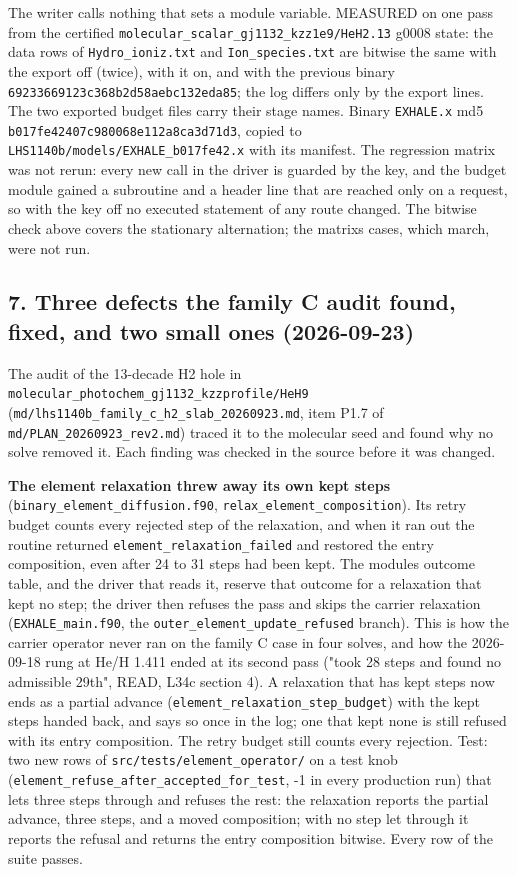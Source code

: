 \documentclass[english,a4paper]{my_memo}
\begin{document}
The writer calls nothing that sets a module variable. MEASURED on one pass
from the certified \texttt{molecular\_scalar\_gj1132\_kzz1e9/HeH2.13} g0008 state: the
data rows of \texttt{Hydro\_ioniz.txt} and \texttt{Ion\_species.txt} are bitwise the same with
the export off (twice), with it on, and with the previous binary
\texttt{69233669123c368b2d58aebc132eda85}; the log differs only by the export
lines. The two exported budget files carry their stage names. Binary
\texttt{EXHALE.x} md5 \texttt{b017fe42407c980068e112a8ca3d71d3}, copied to
\texttt{LHS1140b/models/EXHALE\_b017fe42.x} with its manifest. The regression matrix
was not rerun: every new call in the driver is guarded by the key, and the
budget module gained a subroutine and a header line that are reached only on
a request, so with the key off no executed statement of any route changed.
The bitwise check above covers the stationary alternation; the matrix\textquotesingle s
cases, which march, were not run.

\subsection{7. Three defects the family C audit found, fixed, and two small ones (2026-09-23)}\label{7-three-defects-the-family-c-audit-found-fixed-and-two-small-ones-2026-09-23}

The audit of the 13-decade H2 hole in
\texttt{molecular\_photochem\_gj1132\_kzzprofile/HeH9}
(\texttt{md/lhs1140b\_family\_c\_h2\_slab\_20260923.md}, item P1.7 of
\texttt{md/PLAN\_20260923\_rev2.md}) traced it to the molecular seed and found why no
solve removed it. Each finding was checked in the source before it was
changed.

\textbf{The element relaxation threw away its own kept steps}
(\texttt{binary\_element\_diffusion.f90}, \texttt{relax\_element\_composition}). Its retry
budget counts every rejected step of the relaxation, and when it ran out the
routine returned \texttt{element\_relaxation\_failed} and restored the entry
composition, even after 24 to 31 steps had been kept. The module\textquotesingle s outcome
table, and the driver that reads it, reserve that outcome for a relaxation
that kept no step; the driver then refuses the pass and skips the carrier
relaxation (\texttt{EXHALE\_main.f90}, the \texttt{outer\_element\_update\_refused} branch).
This is how the carrier operator never ran on the family C case in four
solves, and how the 2026-09-18 rung at He/H 1.411 ended at its second pass
("took 28 steps and found no admissible 29th", READ, L34c section 4). A
relaxation that has kept steps now ends as a partial advance
(\texttt{element\_relaxation\_step\_budget}) with the kept steps handed back, and says
so once in the log; one that kept none is still refused with its entry
composition. The retry budget still counts every rejection. Test: two new
rows of \texttt{src/tests/element\_operator/} on a test knob
(\texttt{element\_refuse\_after\_accepted\_for\_test}, -1 in every production run) that
lets three steps through and refuses the rest: the relaxation reports the
partial advance, three steps, and a moved composition; with no step let
through it reports the refusal and returns the entry composition bitwise.
Every row of the suite passes.
\end{document}
